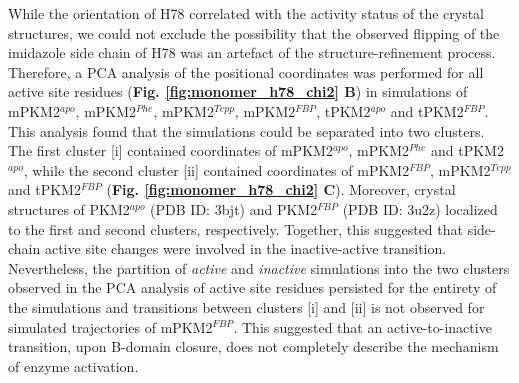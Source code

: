 %
\clearpage
%
%
%
While the orientation of H78 correlated with the activity status of the crystal structures, we could not exclude the possibility that the observed flipping of the imidazole side chain of H78 was an artefact of the structure-refinement process. Therefore, a PCA analysis of the positional coordinates was performed for all active site residues (\textbf{Fig. \ref{fig:monomer_h78_chi2} B}) in simulations of mPKM2$^{apo}$, mPKM2$^{Phe}$, mPKM2$^{Tepp}$, mPKM2$^{FBP}$, tPKM2$^{apo}$ and tPKM2$^{FBP}$. This analysis found that the simulations could be separated into two clusters. The first cluster [i] contained coordinates of mPKM2$^{apo}$, mPKM2$^{Phe}$ and tPKM2$^{apo}$, while the second cluster [ii] contained coordinates of mPKM2$^{FBP}$, mPKM2$^{Tepp}$ and tPKM2$^{FBP}$ (\textbf{Fig. \ref{fig:monomer_h78_chi2} C}). Moreover, crystal structures of PKM2$^{apo}$ (PDB ID: 3bjt) and PKM2$^{FBP}$ (PDB ID: 3u2z) localized to the first and second clusters, respectively. Together, this suggested that side-chain active site changes were involved in the inactive-active transition. Nevertheless, the partition of \textit{active} and \textit{inactive} simulations into the two clusters observed in the PCA analysis of active site residues persisted for the entirety of the simulations and transitions between clusters [i] and [ii] is not observed for simulated trajectories of mPKM2$^{FBP}$. This suggested that an active-to-inactive transition, upon B-domain closure, does not completely describe the mechanism of enzyme activation. 

\clearpage


